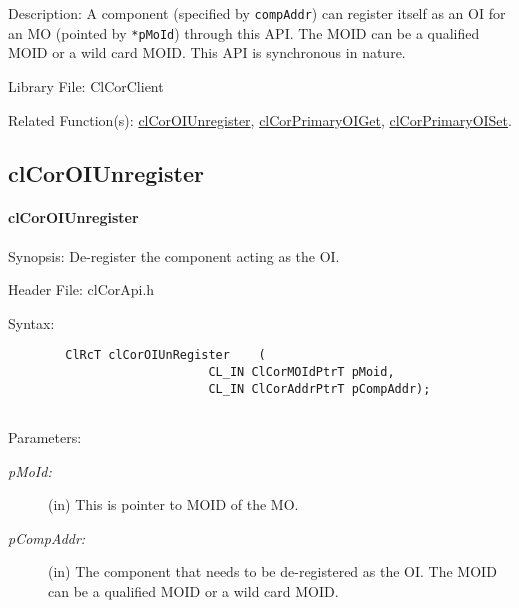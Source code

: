 \begin{flushleft}
\begin{Desc}
\begin{description}
 
 \end{description}
\end{Desc}
\begin{Desc}
\item[Description:]
A component (specified by {\tt{compAddr}}) can register itself as an OI for an MO (pointed by {\tt{*pMoId}}) through this API.
The MOID can be a qualified MOID or a wild card MOID.
This API is synchronous in nature.

\end{Desc}
\begin{Desc}
\item[Library File:]Cl\-Cor\-Client\end{Desc}
\begin{Desc}
\item[Related Function(s):]\hyperlink{pagecor136}{clCorOIUnregister},  \hyperlink{pagecor138}{clCorPrimaryOIGet}, 
\hyperlink{pagecor137}{clCorPrimaryOISet}.\end{Desc}
\newpage





\subsection{clCorOIUnregister}
\hypertarget{pagecor136}{}\paragraph{cl\-Cor\-OI\-Unregister}\label{pagecor136}
\begin{Desc}
\item[Synopsis:]De-register the component acting as the OI.\end{Desc}
\begin{Desc}
\item[Header File:]clCorApi.h\end{Desc}
\begin{Desc}
\item[Syntax:]

\footnotesize\begin{verbatim}        ClRcT clCorOIUnRegister	(
     						CL_IN ClCorMOIdPtrT pMoid,
     						CL_IN ClCorAddrPtrT pCompAddr);


\end{verbatim}
\normalsize
\end{Desc}
\begin{Desc}
\item[Parameters:]
\begin{description}
\item[{\em p\-MoId:}](in) This is pointer to MOID of the MO.
\item[{\em p\-Comp\-Addr:}](in) The component that needs to be de-registered as the OI.
The MOID can be a qualified MOID or a wild card MOID.


\end{description}
\end{Desc}
\end{flushleft}
